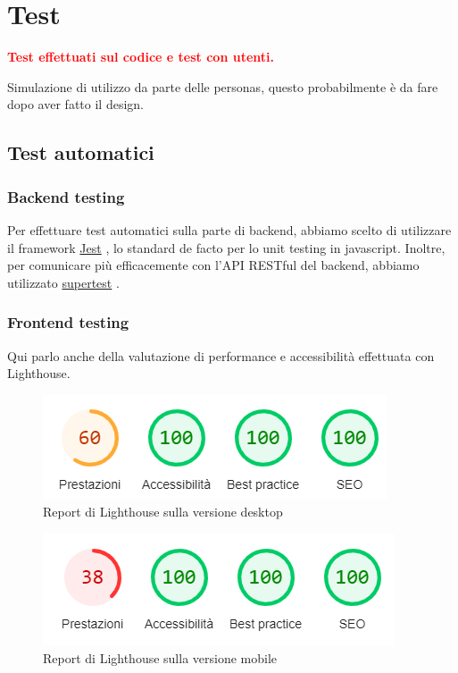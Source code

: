 \documentclass{article}
\newcommand{\jest}{\href{https://jestjs.io/}{Jest} }
\newcommand{\supertest}{\href{https://www.npmjs.com/package/supertest}{supertest} }
\begin{document}
\section{Test}
\textcolor{red}{\textbf{Test effettuati sul codice e test con utenti.}}

Simulazione di utilizzo da parte delle personas, questo probabilmente è da fare dopo aver fatto il design.

\subsection{Test automatici}
\subsubsection{Backend testing}
Per effettuare test automatici sulla parte di backend, abbiamo scelto di utilizzare il framework \jest, lo standard de facto per lo unit testing in javascript. Inoltre, per comunicare più efficacemente con l'API RESTful del backend, abbiamo utilizzato \supertest.

\subsubsection{Frontend testing}
Qui parlo anche della valutazione di performance e accessibilità effettuata con Lighthouse.

\begin{figure}
	\centering
	\includegraphics[scale=0.7]{lighthouse_report_desktop}
	\caption{Report di Lighthouse sulla versione desktop}
	\label{fig:lighthouse_report_desktop}
\end{figure}

\begin{figure}
	\centering
	\includegraphics[scale=0.7]{lighthouse_report_mobile}
	\caption{Report di Lighthouse sulla versione mobile}
	\label{fig:lighthouse_report_mobile}
\end{figure}
\end{document}
